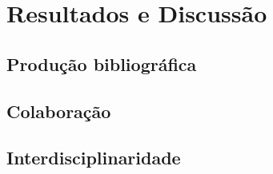 \chapter{Resultados e Discussão}

\section{Produção bibliográfica}

\section{Colaboração}

\section{Interdisciplinaridade}
